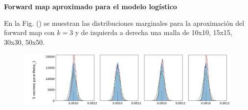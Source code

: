 
\newpage

\textbf{Forward map aproximado para el modelo logístico}











En la Fig. () se muestran las distribuciones marginales para la aproximación del forward map con $k = 3$ y de izquierda a derecha una malla de 10x10, 15x15, 30x30, 50x50.

\begin{figure}[H] 
    \centering 
    \includegraphics[width = 16 cm ]{img/Exp_Central_logistico_Sigma/Figuras/Generales/Convergencia_theta1_1_logistico_sigma.png} 
\end{figure} 

